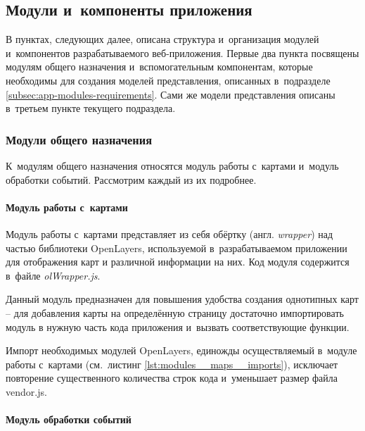 \subsection{Модули и~компоненты приложения}

В пунктах, следующих далее, описана структура и~организация модулей и~компонентов разрабатываемого веб-приложения. Первые два пункта посвящены модулям общего назначения и~вспомогательным компонентам, которые необходимы для создания моделей представления, описанных в~подразделе \ref{subsec:app-modules-requirements}. Сами же модели представления описаны в~третьем пункте текущего подраздела.


\subsubsection{Модули общего назначения}

К~модулям общего назначения относятся модуль работы с~картами и~модуль обработки событий. Рассмотрим каждый из их подробнее.

\paragraph{Модуль работы с~картами}

Модуль работы с~картами представляет из себя обёртку (англ. \emph{wrapper}) над частью библиотеки OpenLayers, используемой в~разрабатываемом приложении для отображения карт и различной информации на них. Код модуля содержится в~файле \emph{olWrapper.js}.

Данный модуль предназначен для повышения удобства создания однотипных карт -- для добавления карты на определённую страницу достаточно импортировать модуль в нужную часть кода приложения и~вызвать соответствующие функции.

Импорт необходимых модулей OpenLayers, единожды осуществляемый в~модуле работы с~картами (см.~листинг \ref{lst:modules__maps__imports}), исключает повторение существенного количества строк кода и~уменьшает размер файла vendor.js.





\paragraph{Модуль обработки событий}

